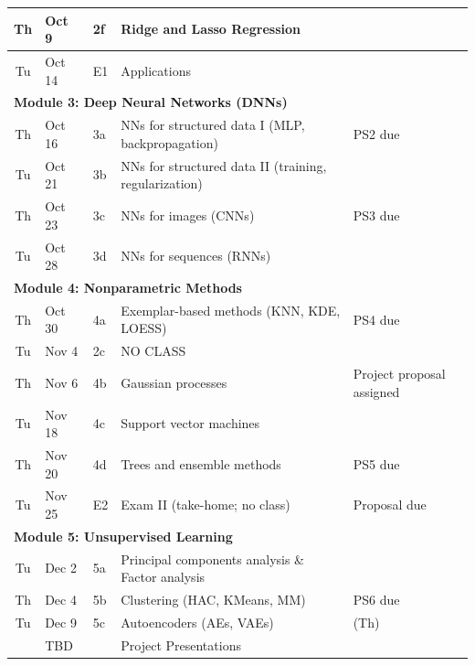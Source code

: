 \documentclass[11pt,twoside]{article}
\numberwithin{equation}{section}
\newcommand{\?}{\stackrel{?}{=}}
\begin{document}
\begin{table}[h!]
\begin{tabular}{cllll}
Th       & Oct 9     & 2f      & Ridge and Lasso Regression                      &                             \\
\midrule
Tu     & Oct 14    & E1      & Applications                          &    \\%
\midrule
\multicolumn{4}{l}{\bf Module 3: Deep Neural Networks (DNNs)}                                                    \\\midrule
Th       & Oct 16    & 3a      & NNs for structured data I (MLP, backpropagation)             & PS2 due                             \\
Tu       & Oct 21    & 3b      & NNs for structured data II (training, regularization) &                                \\
Th       & Oct 23    & 3c      & NNs for images (CNNs)                                 &  PS3 due                              \\
Tu       & Oct 28    & 3d      & NNs for sequences (RNNs)                              &           \\
\midrule
\multicolumn{4}{l}{\bf Module 4:  Nonparametric Methods}                                                                  \\\midrule
Th       & Oct 30    & 4a      & Exemplar-based methods (KNN, KDE, LOESS)              &  PS4 due      \\
Tu       & Nov 4    & 2c      & NO CLASS                          &                     \\ 
Th       & Nov 6     & 4b      & Gaussian processes                                    & Project proposal assigned                               \\
Tu       & Nov 18    & 4c      & Support vector machines                               &                                \\
Th       & Nov 20    & 4d      & Trees and ensemble methods                            &   PS5 due            \\
\midrule
Tu       & Nov 25    &  E2     &  Exam II (take-home; no class)                        &    Proposal due\\%
\midrule
\multicolumn{4}{l}{\bf Module 5: Unsupervised Learning}                                                               \\\midrule
Tu       & Dec 2     & 5a      & Principal components analysis \& Factor analysis                   &                                \\ 
Th       & Dec 4     & 5b      &  Clustering (HAC, KMeans, MM)                                  &                  PS6 due              \\
Tu       & Dec 9     & 5c      &  Autoencoders (AEs, VAEs)                             &     (Th)                    \\ \midrule
       & TBD    &         &  Project Presentations                         &                         \\ 
\bottomrule
\end{tabular}

\end{table}
 
\end{document}
